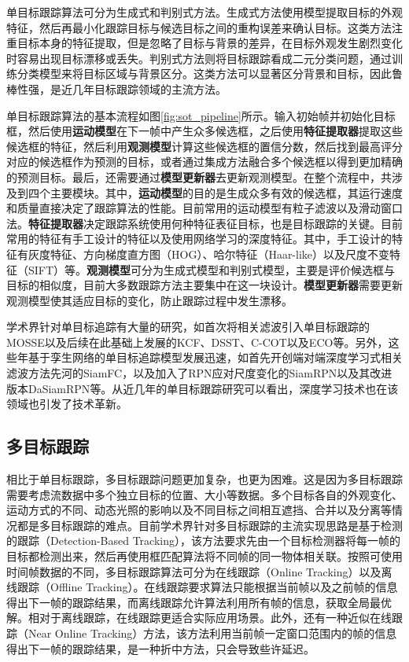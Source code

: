 单目标跟踪算法可分为生成式和判别式方法。生成式方法使用模型提取目标的外观特征，然后再最小化跟踪目标与候选目标之间的重构误差来确认目标。这类方法注重目标本身的特征提取，但是忽略了目标与背景的差异，在目标外观发生剧烈变化时容易出现目标漂移或丢失。判别式方法则将目标跟踪看成二元分类问题，通过训练分类模型来将目标区域与背景区分。这类方法可以显著区分背景和目标，因此鲁棒性强，是近几年目标跟踪领域的主流方法\cite{Wang2015Understanding}。



单目标跟踪算法的基本流程如图\ref{fig:sot_pipeline}所示。输入初始帧并初始化目标框，然后使用\textbf{运动模型}在下一帧中产生众多候选框，之后使用\textbf{特征提取器}提取这些候选框的特征，然后利用\textbf{观测模型}计算这些候选框的置信分数，然后找到最高评分对应的候选框作为预测的目标，或者通过集成方法融合多个候选框以得到更加精确的预测目标。最后，还需要通过\textbf{模型更新器}去更新观测模型。在整个流程中，共涉及到四个主要模块。其中，\textbf{运动模型}的目的是生成众多有效的候选框，其运行速度和质量直接决定了跟踪算法的性能。目前常用的运动模型有粒子滤波以及滑动窗口法。\textbf{特征提取器}决定跟踪系统使用何种特征表征目标，也是目标跟踪的关键。目前常用的特征有手工设计的特征以及使用网络学习的深度特征。其中，手工设计的特征有灰度特征、方向梯度直方图（HOG）、哈尔特征（Haar-like）以及尺度不变特征（SIFT）等。\textbf{观测模型}可分为生成式模型和判别式模型，主要是评价候选框与目标的相似度，目前大多数跟踪方法主要集中在这一块设计。\textbf{模型更新器}需要更新观测模型使其适应目标的变化，防止跟踪过程中发生漂移。

学术界针对单目标追踪有大量的研究，如首次将相关滤波引入单目标跟踪的MOSSE\cite{bolme2010visual}以及后续在此基础上发展的KCF\cite{henriques2014high}、DSST\cite{danelljan2014accurate}、C-COT\cite{danelljan2016beyond}以及ECO\cite{danelljan2017eco}等。另外，这些年基于孪生网络的单目标追踪模型发展迅速，如首先开创端对端深度学习式相关滤波方法先河的SiamFC\cite{bertinetto2016fully}，以及加入了RPN应对尺度变化的SiamRPN\cite{li2018high}以及其改进版本DaSiamRPN\cite{zhu2018distractor}等。从近几年的单目标跟踪研究可以看出，深度学习技术也在该领域也引发了技术革新。

\subsection{多目标跟踪}
\label{mot}

相比于单目标跟踪，多目标跟踪问题更加复杂，也更为困难。这是因为多目标跟踪需要考虑流数据中多个独立目标的位置、大小等数据。多个目标各自的外观变化、运动方式的不同、动态光照的影响以及不同目标之间相互遮挡、合并以及分离等情况都是多目标跟踪的难点\cite{Wang2015Understanding}。目前学术界针对多目标跟踪的主流实现思路是基于检测的跟踪（Detection-Based Tracking），该方法要求先由一个目标检测器将每一帧的目标都检测出来，然后再使用框匹配算法将不同帧的同一物体相关联。按照可使用时间帧数据的不同，多目标跟踪算法可分为在线跟踪（Online Tracking）以及离线跟踪（Offline Tracking）。在线跟踪要求算法只能根据当前帧以及之前帧的信息得出下一帧的跟踪结果，而离线跟踪允许算法利用所有帧的信息，获取全局最优解。相对于离线跟踪，在线跟踪更适合实际应用场景。此外，还有一种近似在线跟踪（Near Online Tracking）方法，该方法利用当前帧一定窗口范围内的帧的信息得出下一帧的跟踪结果，是一种折中方法，只会导致些许延迟。

